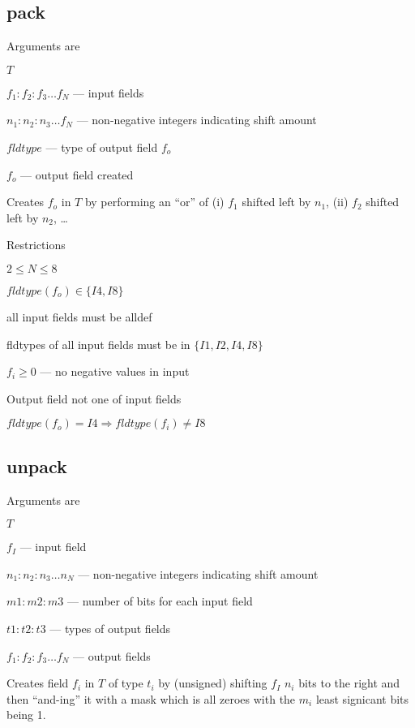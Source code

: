 \subsection{pack}
\label{pack}

Arguments are
\be
\item \(T\)
\item \(f_1:f_2:f_3 \ldots f_N\) --- input fields
\item \(n_1:n_2:n_3 \ldots f_N\) --- non-negative integers indicating shift
amount
\item \(fldtype\) --- type of output field \(f_o\)
\item \(f_o\)  --- output field created
\ee

Creates \(f_o\) in \(T\) by performing an ``or'' of 
(i) \(f_1\) shifted left by \(n_1\), 
(ii) \(f_2\) shifted left by \(n_2\), \ldots

Restrictions
\be
\item \(2 \leq N \leq 8 \)
\item \(fldtype(f_o) \in \{I4, I8\}\)
\item all input fields must be alldef
\item fldtypes of all input fields must be in \(\{I1, I2, I4, I8\}\)
\item \(f_i \geq 0 \) --- no negative values in input 
\item Output field not one of input fields
\item \(fldtype(f_o) = I4 \Rightarrow fldtype(f_i) \neq I8\)
\ee

\subsection{unpack}
\label{unpack}

Arguments are
\be
\item \(T\)
\item \(f_I\)  --- input field 
\item \(n_1:n_2:n_3 \ldots n_N\) --- non-negative integers indicating shift
amount
\item \(m1:m2:m3\) --- number of bits for each input field 
\item \(t1:t2:t3\) --- types of output fields
\item \(f_1:f_2:f_3 \ldots f_N\) --- output fields 
\ee

Creates field \(f_i\) in \(T\) of type \(t_i\) by (unsigned) shifting
\(f_I\) \(n_i\) bits to the right and then ``and-ing'' it with a mask
which is all zeroes with the \(m_i\) least signicant bits being 1. 


